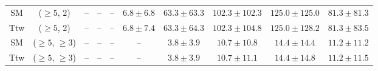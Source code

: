 \begin{table}[h!]
{\begin{tabular}{cccccccccc}
	SM & ($\ge5$, 2) & -- & -- & -- & $6.8\pm 6.8$ & $63.3\pm 63.3$ & $102.3\pm 102.3$ & $125.0\pm 125.0$ & $81.3\pm 81.3$ \\[0.5ex] 
	Ttw & ($\ge5$, 2) & -- & -- & -- & $6.8\pm 7.4$ & $63.3\pm 64.3$ & $102.3\pm 104.8$ & $125.0\pm 128.2$ & $81.3\pm 83.5$ \\[0.5ex] 
	SM & ($\ge5$, $\ge3$) & -- & -- & -- & -- & $3.8\pm 3.9$ & $10.7\pm 10.8$ & $14.4\pm 14.4$ & $11.2\pm 11.2$ \\[0.5ex] 
	Ttw & ($\ge5$, $\ge3$) & -- & -- & -- & -- & $3.8\pm 3.9$ & $10.7\pm 11.1$ & $14.4\pm 14.8$ & $11.2\pm 11.5$ \\[0.5ex] 
	\hline
	\hline
\end{tabular}}
\end{table}
